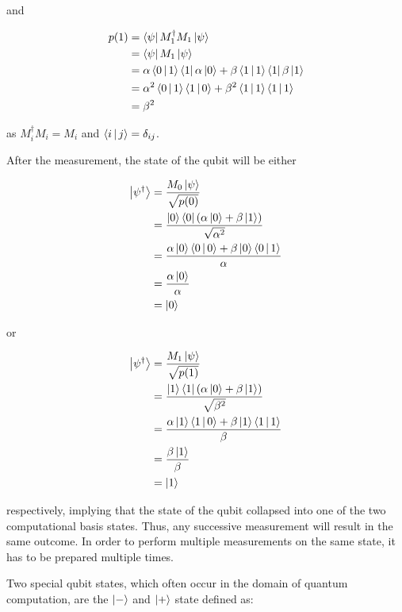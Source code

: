 and

\begin{align}
  p(1) &= \Bra{\psi} M_1^{\dagger} M_1 \Ket{\psi} \\
       &= \Bra{\psi} M_1 \Ket{\psi} \\
       &= \alpha \Braket{0|1} \Bra{1} \alpha \Ket{0} + \beta \Braket{1|1} \Bra{1} \beta \Ket{1} \\
       &= \alpha^2 \Braket{0|1} \Braket{1|0} + \beta^2 \Braket{1|1} \Braket{1|1} \\
       &= \beta^2
\end{align}

as $M_i^{\dagger}M_i = M_i$ and $\Braket{i|j} = \delta_{ij}$.

After the measurement, the state of the qubit will be either

\begin{align}
  \Ket{\psi^{\dagger}} &= \frac{M_0 \Ket{\psi}}{\sqrt{p(0)}} \\
                       &= \frac{\Ket{0}\Bra{0}\left(\alpha \Ket{0} + \beta \Ket{1}\right)}{\sqrt{\alpha^2}} \\
                       &= \frac{\alpha \Ket{0}\Braket{0 | 0} + \beta \Ket{0} \Braket{ 0 | 1} }{\alpha} \\
                       &= \frac{\alpha \Ket{0}}{\alpha} \\
                       &= \Ket{0}
\end{align}

or

\begin{align}
  \Ket{\psi^{\dagger}} &= \frac{M_1 \Ket{\psi}}{\sqrt{p(1)}} \\
                       &= \frac{\Ket{1}\Bra{1}\left(\alpha \Ket{0} + \beta \Ket{1}\right)}{\sqrt{\beta^2}} \\
                       &= \frac{\alpha \Ket{1}\Braket{1 | 0} + \beta \Ket{1} \Braket{ 1 | 1} }{\beta} \\
                       &= \frac{\beta \Ket{1}}{\beta} \\
                       &= \Ket{1}
\end{align}

respectively, implying that the state of the qubit collapsed into one of the two computational
basis states. Thus, any successive measurement will result in the same outcome.
In order to perform multiple measurements on the same state, it has to be prepared multiple times.

Two special qubit states, which often occur in the domain of quantum computation, are the $\Ket{-}$ and $\Ket{+}$ state defined as:

